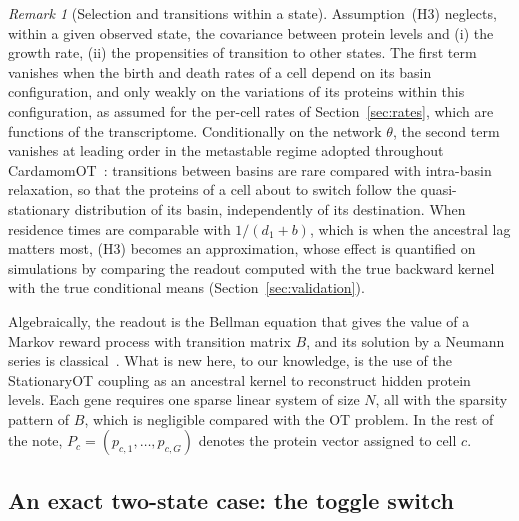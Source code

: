 \documentclass[a4paper, 11pt]{article}
\theoremstyle{plain}
\theoremstyle{remark}
\newtheorem{rem}{Remark}
\begin{document}
\begin{rem}[Selection and transitions within a state]\label{rem:H3}
Assumption~(H3) neglects, within a given observed state, the covariance between protein levels and (i) the growth rate, (ii) the propensities of transition to other states. The first term vanishes when the birth and death rates of a cell depend on its basin configuration, and only weakly on the variations of its proteins within this configuration, as assumed for the per-cell rates of Section~\ref{sec:rates}, which are functions of the transcriptome. Conditionally on the network $\theta$, the second term vanishes at leading order in the metastable regime adopted throughout CardamomOT~\cite{mauge2026cardamomot, ventre2021reduction}: transitions between basins are rare compared with intra-basin relaxation, so that the proteins of a cell about to switch follow the quasi-stationary distribution of its basin, independently of its destination. When residence times are comparable with $1/(d_1 + b)$, which is when the ancestral lag matters most, (H3) becomes an approximation, whose effect is quantified on simulations by comparing the readout computed with the true backward kernel with the true conditional means (Section~\ref{sec:validation}).
\end{rem}

Algebraically, the readout is the Bellman equation that gives the value of a Markov reward process with transition matrix $B$, and its solution by a Neumann series is classical~\cite{puterman1994markov}. What is new here, to our knowledge, is the use of the StationaryOT coupling as an ancestral kernel to reconstruct hidden protein levels. Each gene requires one sparse linear system of size $N$, all with the sparsity pattern of $B$, which is negligible compared with the OT problem. In the rest of the note, $P_c = (p_{c,1}, \dots, p_{c,G})$ denotes the protein vector assigned to cell $c$.

\subsection{An exact two-state case: the toggle switch}\label{sec:twostate}
\end{document}
